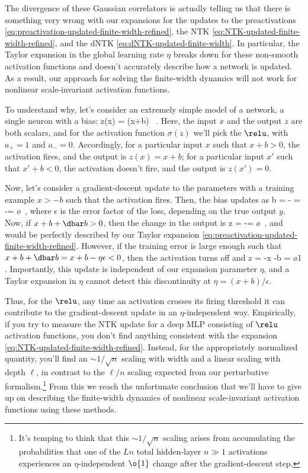The divergence of these Gaussian correlators is actually telling us that there is something very wrong with our expansions for the updates to the preactivations \eqref{eq:preactivation-updated-finite-width-refined}, the NTK \eqref{eq:NTK-updated-finite-width-refined}, and the dNTK \eqref{eq:dNTK-updated-finite-width}. In particular, the Taylor expansion in the global learning rate $\eta$ breaks down for these non-smooth activation functions and doesn't accurately describe how a network is updated. As a result, our approach for solving the finite-width dynamics will not work for nonlinear scale-invariant activation functions.

To understand why, let's consider an extremely simple model of a network, a single neuron with a bias:
\be
z(x) = \sigma(x+b) \, .
\ee
Here, the input $x$ and the output $z$ are both scalars, and for the activation function $\sigma(z)$ we'll pick the $\relu$, with $a_+=1$ and $a_-=0$. 
Accordingly, for a particular input $x$ such that $x+b > 0$, the activation fires, and the output is $z(x)=x+b$; for a particular input $x'$ such that $x' + b < 0$, the activation doesn't fire, and the output is $z(x')=0$. 

Now, let's consider a gradient-descent update to the parameters with a training example $x>-b$ such that the activation fires. Then, the bias updates as
\be
\dbar b = - \eta {} \epsilon = -\eta \epsilon = \o{\eta}\, ,
\ee
where $\epsilon$ is the error factor of the loss, depending on the true output $y$. Now, if $x + b + \dbar b > 0$, then the change in the output is
\be
\dbar z = -\eta \epsilon = \o{\eta}\, ,
\ee
and would be perfectly described by our Taylor expansion \eqref{eq:preactivation-updated-finite-width-refined}. However, if the training error is large enough
such that $x + b + \dbar b=x + b -\eta \epsilon < 0$, then the activation turns off and
\be
\dbar z = -x -b = \o{1}\, .
\ee
Importantly, this update is independent of our expansion parameter $\eta$, and a Taylor expansion in $\eta$ cannot detect this discontinuity at $\eta=(x+b)/\epsilon$.

Thus, for the $\relu$, any time an activation crosses its firing threshold it can contribute  to the gradient-descent update in an $\eta$-independent way. 
Empirically, if you try to measure the NTK update for a deep MLP consisting of $\relu$ activation functions, you don't find anything consistent with the expansion \eqref{eq:NTK-updated-finite-width-refined}. Instead, for the appropriately normalized quantity, you'll find an $\sim 1/\sqrt{n}$ scaling with width and a linear scaling with depth $\ell$, in contrast to the $\ell/n$ scaling expected from our perturbative formalism.\footnote{
    It's temping to think that this $\sim 1/\sqrt{n}$ scaling arises from
    accumulating the probabilities that one of the $L n$ total hidden-layer $n \gg 1$ activations
 experiences an $\eta$-independent $\o{1}$ change after the gradient-descent step.
} From this we reach the unfortunate conclusion that we'll have to give up on describing the finite-width dynamics of nonlinear scale-invariant activation functions using these methods.

